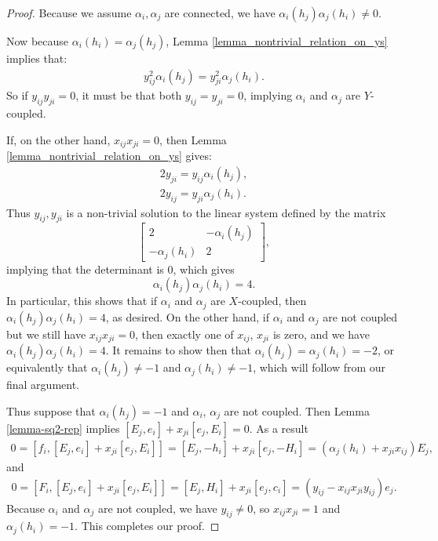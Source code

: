 \documentclass[10pt,a4paper]{amsart}
\begin{document}
	\begin{proof}
		Because we assume $\alpha_i,\alpha_j$ are connected, we have $\alpha_i(h_j)\alpha_j(h_i)\neq0$.  
		
		Now because $\alpha_i(h_i)=\alpha_j(h_j)$, Lemma \ref{lemma_nontrivial_relation_on_ys} implies that:
		\begin{align}
			y_{ij}^2\alpha_i(h_j) = y_{ji}^2\alpha_j(h_i).
		\end{align}
		So if \(y_{ij}y_{ji} = 0\), it must be that both \(y_{ij}=y_{ji} = 0\), implying \(\alpha_i\) and \(\alpha_j\) are $Y$-coupled.
		
		If, on the other hand, \(x_{ij}x_{ji} = 0\), then Lemma \ref{lemma_nontrivial_relation_on_ys} gives:
		\begin{align*}
			2y_{ji} = y_{ij}\alpha_i(h_j), \\
			2y_{ij} = y_{ji}\alpha_j(h_i).
		\end{align*}
		Thus \(y_{ij},y_{ji}\) is a non-trivial solution to the linear system defined by the matrix 
		\[
		\begin{bmatrix} 2 & -\alpha_i(h_j)\\ -\alpha_j(h_i) & 2\end{bmatrix},
		\]
		implying that the determinant is 0, which gives
		\[
		\alpha_i(h_j)\alpha_j(h_i) = 4.
		\]
		In particular, this shows that if $\alpha_i$ and $\alpha_j$ are $X$-coupled, then $\alpha_i(h_j)\alpha_j(h_i)=4$, as desired. On the other hand, if \(\alpha_i\) and \(\alpha_j\) are not coupled but we still have $x_{ij}x_{ji}=0$, then exactly one of \(x_{ij}\), \(x_{ji}\) is zero, and we have $\alpha_i(h_j)\alpha_j(h_i)=4$.  It remains to show then that $\alpha_i(h_j)=\alpha_j(h_i)=-2$, or equivalently that $\alpha_i(h_j)\neq-1$ and $\alpha_j(h_i)\neq-1$, which will follow from our final argument.
		
		Thus suppose that \(\alpha_i(h_j) = -1\) and \(\alpha_i\), \(\alpha_j\) are not coupled. Then Lemma \ref{lemma-sq2-rep} implies \([E_j,e_i] + x_{ji}[e_j,E_i] = 0\). As a result
		\begin{align*}
			0 = [f_i,[E_j,e_i] + x_{ji}[e_j,E_i]] = [E_j,-h_i]+ x_{ji}[e_j,-H_i] = (\alpha_j(h_i)+x_{ji}x_{ij})E_j,
		\end{align*}
		and
		\begin{align*}
			0 = [F_i,[E_j,e_i] + x_{ji}[e_j,E_i]] = [E_j,H_i] + x_{ji}[e_j,c_i] = (y_{ij}-x_{ij}x_{ji}y_{ij})e_j.
		\end{align*}
		Because \(\alpha_i\) and \(\alpha_j\) are not coupled, we have \(y_{ij} \neq 0\), so \(x_{ij}x_{ji}=1\) and \(\alpha_j(h_i) = -1\).  This completes our proof.
	\end{proof}
\end{document}

